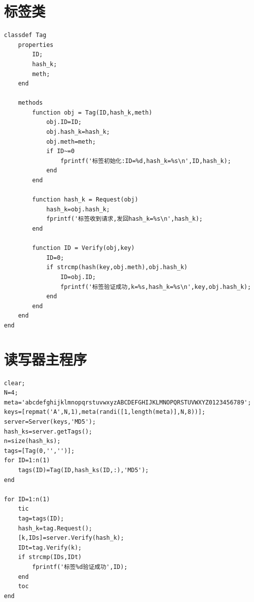 \documentclass[a4paper]{ctexart}
\begin{document}
\section{标签类}
\begin{lstlisting}
classdef Tag
    properties
        ID;
        hash_k;
        meth;
    end
    
    methods
        function obj = Tag(ID,hash_k,meth)
            obj.ID=ID;
            obj.hash_k=hash_k;
            obj.meth=meth;
            if ID~=0
                fprintf('标签初始化:ID=%d,hash_k=%s\n',ID,hash_k);
            end
        end
        
        function hash_k = Request(obj)
            hash_k=obj.hash_k;
            fprintf('标签收到请求,发回hash_k=%s\n',hash_k);
        end
        
        function ID = Verify(obj,key)
            ID=0;
            if strcmp(hash(key,obj.meth),obj.hash_k)
                ID=obj.ID;
                fprintf('标签验证成功,k=%s,hash_k=%s\n',key,obj.hash_k);
            end
        end
    end
end
\end{lstlisting}
\section{读写器主程序}
\begin{lstlisting}
clear;
N=4;
meta='abcdefghijklmnopqrstuvwxyzABCDEFGHIJKLMNOPQRSTUVWXYZ0123456789';
keys=[repmat('A',N,1),meta(randi([1,length(meta)],N,8))];
server=Server(keys,'MD5');
hash_ks=server.getTags();
n=size(hash_ks);
tags=[Tag(0,'','')];
for ID=1:n(1)
    tags(ID)=Tag(ID,hash_ks(ID,:),'MD5');
end

for ID=1:n(1)
    tic
    tag=tags(ID);
    hash_k=tag.Request();
    [k,IDs]=server.Verify(hash_k);
    IDt=tag.Verify(k);
    if strcmp(IDs,IDt)
        fprintf('标签%d验证成功',ID);
    end
    toc
end
\end{lstlisting}
\end{document}
